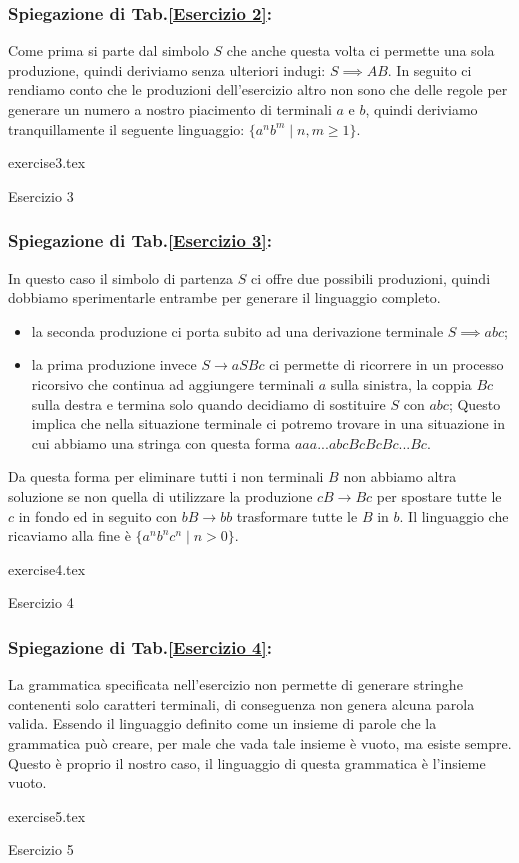 \documentclass[class=book, crop=false, oneside, 12pt]{standalone}
\begin{document}
\subsubsection*{Spiegazione di Tab.\ref{Esercizio 2}:}
Come prima si parte dal simbolo \(S\) che anche questa volta ci permette una sola produzione, quindi deriviamo senza ulteriori indugi: \(S \implies AB\). In seguito ci rendiamo conto che le produzioni dell'esercizio altro non sono che delle regole per generare un numero a nostro piacimento di terminali \(a\) e \(b\), quindi deriviamo tranquillamente il seguente linguaggio: \(\{a^n b^m \mid n,m \ge 1\}\).
\begin{table}[H]
	\centering
	{exercise3.tex}
    \caption{Esercizio 3}
    \label{Esercizio 3}
\end{table}
\subsubsection*{Spiegazione di Tab.\ref{Esercizio 3}:}
In questo caso il simbolo di partenza \(S\) ci offre due possibili produzioni, quindi dobbiamo sperimentarle entrambe per generare il linguaggio completo.
\begin{itemize}
    \item la seconda produzione ci porta subito ad una derivazione terminale \(S \implies abc\);
    \item la prima produzione invece \(S \to aSBc\) ci permette di ricorrere in un processo ricorsivo che continua ad aggiungere terminali \(a\) sulla sinistra, la coppia \(Bc\) sulla destra e termina solo quando decidiamo di sostituire \(S\) con \(abc\); Questo implica che nella situazione terminale ci potremo trovare in una situazione in cui abbiamo una stringa con questa forma \(aaa...abcBcBcBc...Bc\).
\end{itemize}
Da questa forma per eliminare tutti i non terminali \(B\) non abbiamo altra soluzione se non quella di utilizzare la produzione \(cB \to Bc\) per spostare tutte le \(c\) in fondo ed in seguito con \(bB \to bb\) trasformare tutte le \(B\) in \(b\). Il linguaggio che ricaviamo alla fine è \(\{a^nb^nc^n \mid n>0\}\).
\begin{table}[H]
	\centering
	{exercise4.tex}
    \caption{Esercizio 4}
    \label{Esercizio 4}
\end{table}
\subsubsection*{Spiegazione di Tab.\ref{Esercizio 4}:}
La grammatica specificata nell'esercizio non permette di generare stringhe contenenti solo caratteri terminali, di conseguenza non genera alcuna parola valida. Essendo il linguaggio definito come un insieme di parole che la grammatica può creare, per male che vada tale insieme è vuoto, ma esiste sempre. Questo è proprio il nostro caso, il linguaggio di questa grammatica è l’insieme vuoto.
\begin{table}[H]
	\centering
	{exercise5.tex}
    \caption{Esercizio 5}
    \label{Esercizio 5}
\end{table}
\end{document}
